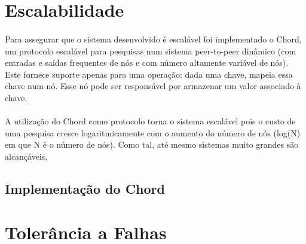 \documentclass[11pt,oneside]{book}
\begin{document}
\section{Escalabilidade}
\paragraph{}
    Para assegurar que o sistema desenvolvido é escalável foi implementado o Chord,
    um protocolo escalável para pesquisas num sistema peer-to-peer dinâmico (com 
    entradas e saídas frequentes de nós e com número altamente variável de nós).
    Este fornece suporte apenas para uma operação: dada uma chave, mapeia essa 
    chave num nó.  Esse nó pode ser responsável por armazenar um valor associado
    à chave. 

\paragraph{}
A utilização do Chord como protocolo torna o sistema escalável pois o custo de
uma pesquisa cresce logaritmicamente com o aumento do número de nós (log(N) em
que N é o número de nós). Como tal, até mesmo sistemas muito grandes são 
alcançáveis.

\subsection{Implementação do Chord}


\section{Tolerância a Falhas}

\paragraph{}
\end{document}
